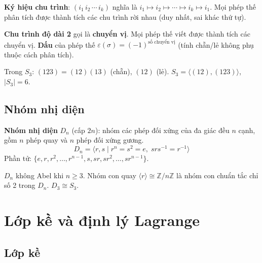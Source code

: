 \documentclass[12pt,a4paper]{article}
\begin{document}
\begin{dinhnghia}
  \textbf{Ký hiệu chu trình}: $(i_1 \, i_2 \, \cdots \, i_k)$ nghĩa là $i_1 \mapsto i_2 \mapsto \cdots \mapsto i_k \mapsto i_1$. Mọi phép thế phân tích được thành tích các chu trình rời nhau (duy nhất, sai khác thứ tự).
\end{dinhnghia}

\begin{dinhnghia}
  \textbf{Chu trình độ dài 2} gọi là \textbf{chuyển vị}. Mọi phép thế viết được thành tích các chuyển vị. \textbf{Dấu} của phép thế $\varepsilon(\sigma) = (-1)^{\text{số chuyển vị}}$ (tính chẵn/lẻ không phụ thuộc cách phân tích).
\end{dinhnghia}

\begin{vidu}
  Trong $S_3$: $(123) = (12)(13)$ (chẵn), $(12)$ (lẻ). $S_3 = \langle (12), (123) \rangle$, $|S_3| = 6$.
\end{vidu}

\subsection{Nhóm nhị diện}

\begin{dinhnghia}
  \textbf{Nhóm nhị diện} $D_n$ (cấp $2n$): nhóm các phép đối xứng của đa giác đều $n$ cạnh, gồm $n$ phép quay và $n$ phép đối xứng gương.
  \[
    D_n = \langle r, s \mid r^n = s^2 = e,\; srs^{-1} = r^{-1} \rangle
  \]
  Phần tử: $\{e, r, r^2, \ldots, r^{n-1}, s, sr, sr^2, \ldots, sr^{n-1}\}$.
\end{dinhnghia}

\begin{tinhchat}
  $D_n$ không Abel khi $n \ge 3$. Nhóm con quay $\langle r \rangle \cong \mathbb{Z}/n\mathbb{Z}$ là nhóm con chuẩn tắc chỉ số 2 trong $D_n$. $D_3 \cong S_3$.
\end{tinhchat}

\section{Lớp kề và định lý Lagrange}

\subsection{Lớp kề}
\end{document}
